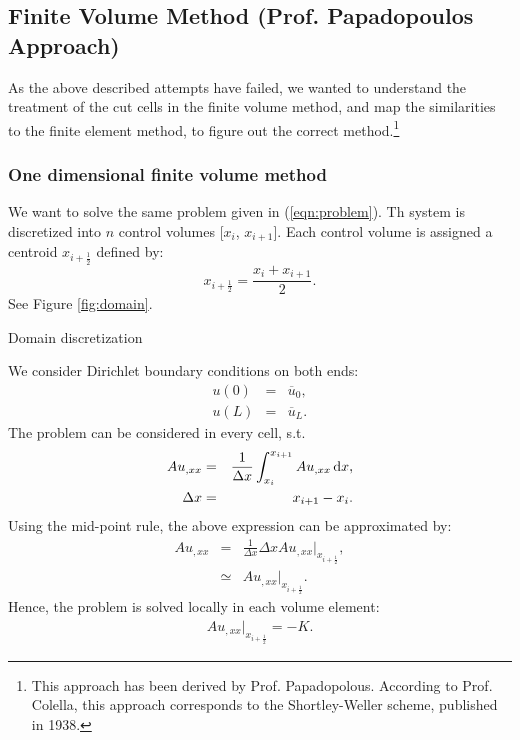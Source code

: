 \documentclass[a4paper,12pt]{article}
\makeatletter
\newcommand{\intd}{\,{\rm d}}
\newenvironment{figurehere}
  {\def\@captype{figure}}
  {}
\makeatother
\begin{document}
\subsection{Finite Volume Method (Prof. Papadopoulos Approach)}\label{sec:PPfinitevolume}
As the above described attempts have failed, we wanted to understand the treatment of the cut cells in the finite volume method, and
map the similarities to the finite element method, to figure out the correct method.\footnote{This approach has been derived by Prof. Papadopolous. According to Prof. Colella, this approach corresponds to the Shortley-Weller scheme, published in 1938.}
\subsubsection{One dimensional finite volume method}
We want to solve the same problem given in (\ref{eqn:problem}). Th system is discretized into $n$ control volumes [$x_i$, $x_{i+1}$]. Each control volume is assigned a centroid $x_{i+\frac{1}{2}}$ defined by:
\begin{equation}
x_{i+\frac{1}{2}} = \frac{x_i + x_{i+1}}{2}.
\end{equation}
See Figure \ref{fig:domain}.
\begin{center}
\begin{figurehere}

\caption{Domain discretization}\label{fig:domain}
\end{figurehere}
\end{center}
We consider Dirichlet boundary conditions on both ends:
\begin{eqnarray}
u(0) &=& \overline{u}_0,\\
u(L) &=& \overline{u}_L.
\end{eqnarray}
The problem can be considered in every cell, s.t.
\begin{eqnarray}
Au_{,xx} &=& \frac{1}{\Delta x}\int_{x_i}^{x_{i+1}}Au_{,xx}\intd x,\\
\Delta x &=& x_{i+1} - x_{i}.
\end{eqnarray}
Using the mid-point rule, the above expression can be approximated by:
\begin{eqnarray}
Au_{,xx} &=& \frac{1}{\Delta x}\Delta x Au_{,xx}\vert_{x_{i+\frac{1}{2}}},\\
&\simeq& Au_{,xx}\vert_{x_{i+\frac{1}{2}}}.
\end{eqnarray}
Hence, the problem is solved locally in each volume element:
\begin{eqnarray}
Au_{,xx}\vert_{x_{i+\frac{1}{2}}} = -K.
\end{eqnarray}
\end{document}
